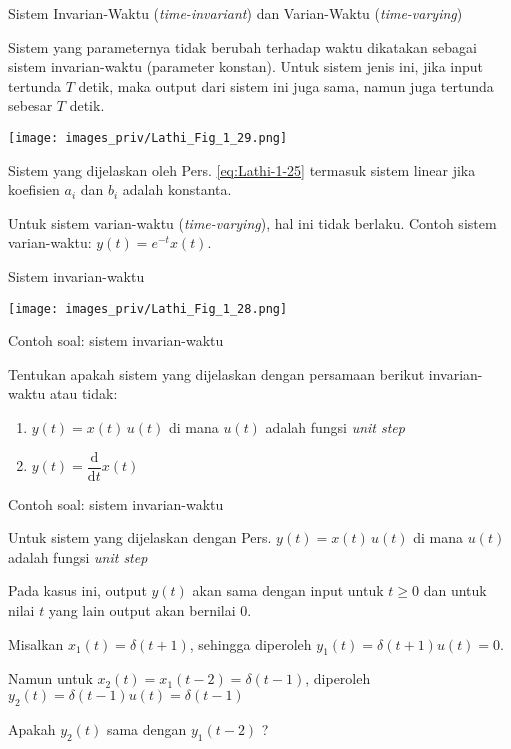 \begin{frame}{Sistem Invarian-Waktu (\textit{time-invariant}) dan
  Varian-Waktu (\textit{time-varying})}

\fontsize{10}{9}\selectfont

Sistem yang parameternya tidak berubah terhadap waktu dikatakan sebagai sistem
invarian-waktu (parameter konstan). Untuk sistem jenis ini, jika input tertunda
$T$ detik, maka output dari sistem ini juga sama, namun juga tertunda sebesar $T$ detik.

{\centering
\texttt{[image: images\_priv/Lathi\_Fig\_1\_29.png]}
\par}

Sistem yang dijelaskan oleh Pers. \eqref{eq:Lathi-1-25} termasuk sistem linear jika
koefisien $a_i$ dan $b_i$ adalah konstanta.

Untuk sistem varian-waktu (\textit{time-varying}), hal ini tidak berlaku.
Contoh sistem varian-waktu: $y(t) = e^{-t} x(t)$.

\end{frame}



\begin{frame}{Sistem invarian-waktu}

{\centering
\texttt{[image: images\_priv/Lathi\_Fig\_1\_28.png]}
\par}

\end{frame}


\begin{frame}{Contoh soal: sistem invarian-waktu}

Tentukan apakah sistem yang dijelaskan dengan persamaan berikut invarian-waktu
atau tidak:
\begin{enumerate}[label=(\alph*)]
\item $y(t) = x(t) \, u(t)$ di mana $u(t)$ adalah fungsi \textit{unit step}
\item $y(t) = \dfrac{\mathrm{d}}{\mathrm{d}t} x(t)$
\end{enumerate}

\end{frame}


\begin{frame}{Contoh soal: sistem invarian-waktu}

Untuk sistem yang dijelaskan dengan Pers. $y(t) = x(t) \, u(t)$
di mana $u(t)$ adalah fungsi \textit{unit step}

Pada kasus ini, output $y(t)$ akan sama dengan input untuk $t \geq 0$ dan untuk nilai $t$ yang lain
output akan bernilai 0.

Misalkan $x_1(t) = \delta(t+1)$, sehingga diperoleh $y_{1}(t) = \delta(t+1) u(t) = 0$.

Namun untuk $x_2(t) = x_{1}(t-2) = \delta(t-1)$, diperoleh $y_{2}(t) = \delta(t-1) u(t) = \delta(t-1)$

Apakah $y_2(t)$ sama dengan $y_1(t-2)$ ?

\end{frame}



